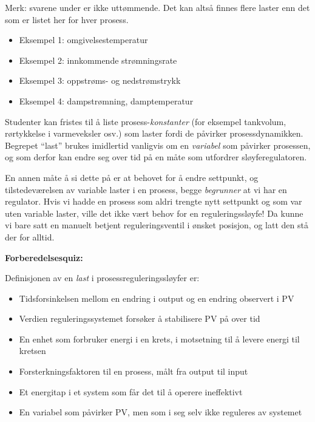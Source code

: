 Merk: svarene under er ikke uttømmende. Det kan altså finnes flere laster enn det som er listet her for hver prosess.

\begin{itemize}
\item{} Eksempel 1: omgivelsestemperatur
\item{} Eksempel 2: innkommende strømningsrate
\item{} Eksempel 3: oppstrøms- og nedstrømstrykk
\item{} Eksempel 4: dampstrømning, damptemperatur
\end{itemize}







Studenter kan fristes til å liste prosess-{\it konstanter} (for eksempel tankvolum, rørtykkelse i varmeveksler osv.) som laster fordi de påvirker prosessdynamikken. Begrepet ``last'' brukes imidlertid vanligvis om en {\it variabel} som påvirker prosessen, og som derfor kan endre seg over tid på en måte som utfordrer sløyferegulatoren.

En annen måte å si dette på er at behovet for å endre settpunkt, og tilstedeværelsen av variable laster i en prosess, begge {\it begrunner} at vi har en regulator. Hvis vi hadde en prosess som aldri trengte nytt settpunkt og som var uten variable laster, ville det ikke vært behov for en reguleringssløyfe! Da kunne vi bare satt en manuelt betjent reguleringsventil i ønsket posisjon, og latt den stå der for alltid.

\vfil \eject

\noindent
{\bf Forberedelsesquiz:}

Definisjonen av en {\it last} i prosessreguleringssløyfer er:

\begin{itemize}
\item{} Tidsforsinkelsen mellom en endring i output og en endring observert i PV
\vskip 5pt 
\item{} Verdien reguleringssystemet forsøker å stabilisere PV på over tid
\vskip 5pt 
\item{} En enhet som forbruker energi i en krets, i motsetning til å levere energi til kretsen
\vskip 5pt 
\item{} Forsterkningsfaktoren til en prosess, målt fra output til input
\vskip 5pt 
\item{} Et energitap i et system som får det til å operere ineffektivt
\vskip 5pt 
\item{} En variabel som påvirker PV, men som i seg selv ikke reguleres av systemet
\end{itemize}





